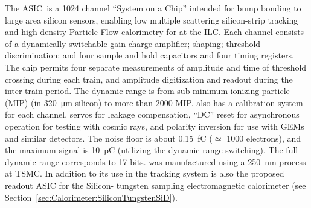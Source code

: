 The \KPIX ASIC~\cite{6551433}is a 1024 channel ``System on a Chip'' intended for bump bonding 
to large area silicon sensors, enabling low multiple scattering silicon-strip 
tracking and high density Particle Flow calorimetry for \SID at the ILC. 
Each channel consists of a dynamically switchable gain charge amplifier; 
shaping; threshold discrimination; and four sample and hold 
capacitors and four timing registers. The chip permits four  separate measurements of 
amplitude and time of threshold crossing during each train, and amplitude 
digitization and readout during the inter-train period. The dynamic range is from 
sub minimum ionizing particle (MIP) (in \SI{320}{\micro\meter} silicon) to more 
than 2000 MIP. \KPIX also has a calibration system for each channel, servos for 
leakage compensation, ``DC'' reset for asynchronous operation for testing with 
cosmic rays, and polarity inversion for use with GEMs and similar detectors. The 
noise floor is about \SI{0.15}{\femto\coulomb} ($\simeq$ 1000 electrons), and the maximum 
signal is \SI{10}{\pico\coulomb} (utilizing the dynamic range switching). The full dynamic 
range corresponds to 17 bits. \KPIX was manufactured using a \SI{250}{\nano\meter} process at TSMC.
In addition to its use in the \SID tracking system  \KPIX is also the proposed readout ASIC  for the \SID Silicon-
tungsten sampling electromagnetic calorimeter (see Section~\ref{sec:Calorimeter:SiliconTungstenSiD}).

